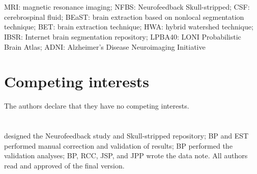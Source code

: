 
\section*{\DIFdelbegin {}\DIFdelend \DIFaddbegin {}\DIFaddend }
  MRI: magnetic resonance imaging; NFBS: Neurofeedback Skull-stripped; CSF: cerebrospinal fluid; BEaST: brain extraction based on nonlocal segmentation technique; BET: brain extraction technique; HWA: hybrid watershed technique; IBSR: Internet brain segmentation repository; LPBA40: LONI Probabilistic Brain Atlas; ADNI: Alzheimer's Disease Neuroimaging Initiative\DIFaddbegin {}\DIFaddend 

\DIFaddbegin \section*{}


\section*{}



\DIFaddend \section*{Competing interests}
  The authors declare that they have no competing interests.

\section*{\DIFdelbegin {}%
\DIFdelend \DIFaddbegin {}}


\section*{}
    \DIFaddend designed the Neurofeedback study and Skull-stripped repository;  BP and EST performed manual correction and validation of results; BP performed the validation analyses; BP, RCC, JSP, and JPP wrote the data note. All authors read and approved of the final version.

